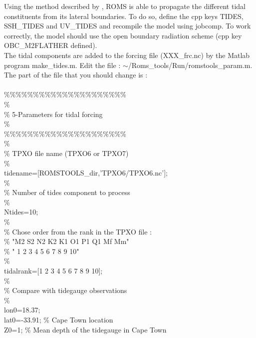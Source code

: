 Using the method described by \citet{Fla76}, ROMS is able to propagate the 
different tidal constituents from its lateral boundaries. To do so, define  
the cpp keys TIDES,  SSH\_TIDES and UV\_TIDES and recompile the model 
using jobcomp. To work correctly, the model should use the \citet{Fla76} 
open boundary radiation scheme (cpp key OBC\_M2FLATHER defined).\\
The tidal components are added to the forcing file (XXX\_frc.nc)
by the Matlab program make\_tides.m.
Edit the file : $\sim$/Roms\_tools/Run/romstools\_param.m.
The part of the file that you should change is :\\
\\
\%\%\%\%\%\%\%\%\%\%\%\%\%\%\%\%\%\%\%\%\%\\
\%\\
\% 5-Parameters for tidal forcing\\
\%\\
\%\%\%\%\%\%\%\%\%\%\%\%\%\%\%\%\%\%\%\%\%\\
\%\\
\% TPXO file name (TPXO6 or TPXO7)\\
\%\\
tidename=[ROMSTOOLS\_dir,'TPXO6/TPXO6.nc'];\\
\%\\
\% Number of tides component to process\\
\%\\
Ntides=10;\\
\%\\
\% Chose order from the rank in the TPXO file :\\
\% "M2 S2 N2 K2 K1 O1 P1 Q1 Mf Mm"\\
\% " 1  2  3  4  5  6  7  8  9 10"\\
\%\\
tidalrank=[1 2 3 4 5 6 7 8 9 10];\\
\%\\
\% Compare with tidegauge observations\\
\%\\
lon0=18.37;\\
lat0=-33.91;   \% Cape Town location\\
Z0=1;          \% Mean depth of the tidegauge in Cape Town\\
\\

